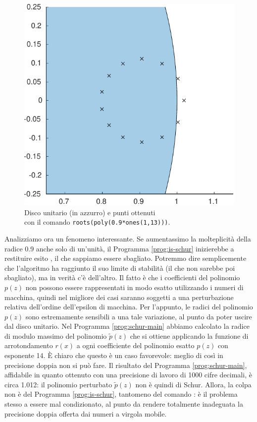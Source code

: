 

\begin{figure}[p]
\centering
\includegraphics[height=0.35\textwidth]{qr13.pdf}
\caption{Disco unitario (in azzurro) e punti ottenuti\\
con il comando \texttt{roots(poly(0.9*ones(1,13)))}.}
\label{fig:qr13}
\end{figure}

Analizziamo ora un fenomeno interessante.
Se aumentassimo la molteplicità della radice 0.9 anche solo
di un'unità, il Programma \ref{prog:is-schur} inizierebbe a restituire esito
, il che sappiamo essere sbagliato.
Potremmo dire semplicemente che l'algoritmo ha raggiunto
il suo limite di stabilità (il che non sarebbe poi sbagliato),
ma in verità c'è dell'altro.
Il fatto è che i coefficienti del polinomio $p(z)$
non possono essere rappresentati in modo esatto utilizzando i numeri
di macchina, quindi nel migliore dei casi saranno soggetti a una perturbazione
relativa dell'ordine dell'epsilon di macchina.
Per l'appunto, le radici del polinomio $p(z)$ sono estremamente sensibili
a una tale variazione, al punto da poter uscire dal disco unitario.
Nel Programma \ref{prog:schur-main} abbiamo calcolato la radice di modulo massimo
del polinomio $\tilde{p}(z)$ che si ottiene applicando la funzione
di arrotondamento $r(x)$ a ogni coefficiente del polinomio esatto $p(z)$
con esponente 14. È chiaro che questo è un caso favorevole:
meglio di così in precisione doppia non si può fare.
Il risultato del Programma \ref{prog:schur-main},
affidabile in quanto ottenuto con una precisione
di lavoro di 1000 cifre decimali, è circa 1.012:
il polinomio perturbato $\tilde{p}(z)$ non è quindi di Schur.
Allora, la colpa non è del Programma \ref{prog:is-schur},
tantomeno del comando :
è il problema stesso a essere mal condizionato,
al punto da rendere totalmente inadeguata la precisione
doppia offerta dai numeri a virgola mobile.

